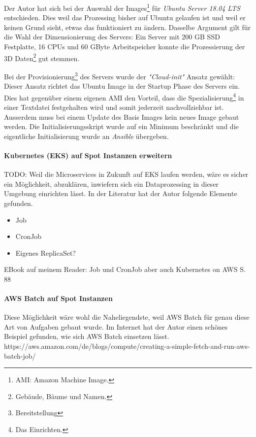 Der Autor hat sich bei der Auswahl der Images\footnote{AMI: Amazon Machine Image.} für \emph{Ubuntu Server 18.04 LTS} entschieden. Dies weil das Prozessing bisher auf Ubuntu gelaufen ist und weil er keinen Grund sieht, etwas das funktioniert zu ändern. Dasselbe Argument gilt für die Wahl der Dimensionierung des Servers: Ein Server mit 200 GB SSD Festplatte, 16 CPUs und 60 GByte Arbeitspeicher konnte die Prozessierung der 3D Daten\footnote{Gebäude, Bäume und Namen.} gut stemmen.

Bei der Provisionierung\footnote{Bereitstellung} des Servers wurde der \emph{"Cloud-init"} Ansatz gewählt: Dieser Ansatz richtet das Ubuntu Image in der Startup Phase des Servers ein. Dies hat gegenüber einem eigenen AMI den Vorteil, dass die Spezialisierung\footnote{Das Einrichten.} in einer Textdatei festgehalten wird und somit jederzeit nachvollziehbar ist. Ausserdem muss bei einem Update des Basis Images kein neues Image gebaut werden.
Die Initialisierungsskript wurde auf ein Minimum beschränkt und die eigentliche Initialisierung wurde an \emph{Ansible} übergeben. 

\paragraph{Kubernetes (EKS) auf Spot Instanzen erweitern}
TODO: Weil die Microservices in Zukunft auf EKS laufen werden, wäre es sicher ein Möglichkeit, abzuklären, inwiefern sich ein Dataprozessing in dieser Umgebung einrichten lässt. In der Literatur hat der Autor folgende Elemente gefunden.

\begin{itemize}
\item Job
\item CronJob
\item Eigenes ReplicaSet?
\end{itemize}

EBook auf meinem Reader: Job und CronJob aber auch Kubernetes on AWS S. 88

\paragraph{AWS Batch auf Spot Instanzen}
Diese Möglichkeit wäre wohl die Naheliegendste, weil AWS Batch für genau diese Art von Aufgaben gebaut wurde. Im Internet hat der Autor einen schönes Beispiel gefunden, wie sich AWS Batch einsetzen lässt.
https://aws.amazon.com/de/blogs/compute/creating-a-simple-fetch-and-run-aws-batch-job/

